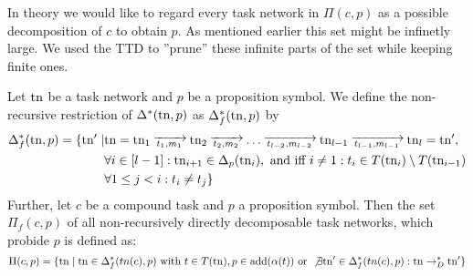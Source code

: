 \documentclass{scrartcl}
\begin{document}
In theory we would like to regard every task network in $\Pi(c,p)$ as a possible decomposition of $c$ to obtain $p$.
As mentioned earlier this set might be infinetly large.
We used the TTD to ''prune'' these infinite parts of the set while keeping finite ones.

\begin{definition}
Let $\mathrm{tn}$ be a task network and $p$ be a proposition symbol.
We define the non-recursive restriction of $\Delta^*(\mathrm{tn},p)$ as $\Delta_f^*(\mathrm{tn},p)$ by
\begin{align*}
\Delta^*_f(\tn,p) = \{\tn' \mid &\tn = \tn_1 \decompose{t_1}{m_1} \tn_2 \decompose{t_2}{m_2} \dots \decompose{t_{l-2}}{m_{l-2}} \tn_{l-1} \decompose{t_{l-1}}{m_{l-1}} \tn_l = \tn', \\
& \forall i \in [l-1]: \tn_{i+1} \in \Delta_p(\tn_i), \text{ and iff } i\neq 1: t_i \in T(\tn_i) \setminus T(\tn_{i-1})\\
& \forall 1 \leq j < i: t_i \neq t_j \}
\end{align*}
Further, let $c$ be a compound task and $p$ a proposition symbol.
Then the set $\Pi_f(c,p)$ of all non-recursively directly decomposable task networks, which probide $p$ is defined as:
\[\Pi(c,p) = \{\mathrm{tn} \mid \mathrm{tn} \in \Delta_f^*(tn(c),p)\text{ with } t \in T(\mathrm{tn}), p \in \text{add}(\alpha(t)) \text { or } \not\exists \mathrm{tn}' \in \Delta_f^*(tn(c),p) : \mathrm{tn} \rightarrow_D^* \mathrm{tn}'\}\]

\end{definition}
\end{document}
